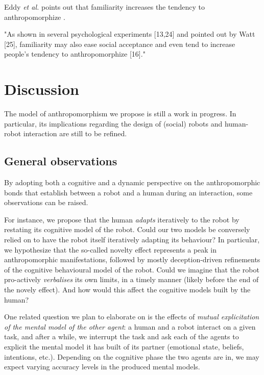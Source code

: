 \documentclass{frontiersSCNS} %
\begin{document}
Eddy \textit{et al.} points out that familiarity increases the tendency to
anthropomorphize \cite{eddy_attribution_1993}.

"As shown in several psychological experiments [13,24] and pointed out by Watt
[25], familiarity may also ease social acceptance and even tend to increase
people's tendency to anthropomorphize [16]." \cite{duffy_anthropomorphism_2003}


%
%
%
%
%
%


\section{Discussion}
\label{sec:discussion}

The model of anthropomorphism we propose is still a work in progress. In
particular, its implications regarding the design of (social) robots and
human-robot interaction are still to be refined.

\subsection{General observations}

By adopting both a cognitive and a dynamic perspective on the anthropomorphic
bonds that establish between a robot and a human during an interaction, some
observations can be raised.

For instance, we propose that the human \emph{adapts} iteratively to the robot
by restating its cognitive model of the robot. Could our two models be
conversely relied on to have the robot itself iteratively adapting its
behaviour? In particular, we hypothesize that the so-called novelty effect
represents a peak in anthropomorphic manifestations, followed by mostly
deception-driven refinements of the cognitive behavioural model of the robot.
Could we imagine that the robot pro-actively \emph{verbalises} its own limits,
in a timely manner (likely before the end of the novely effect). And how would
this affect the cognitive models built by the human?

One related question we plan to elaborate on is the effects of \emph{mutual
explicitation of the mental model of the other agent}: a human and a robot
interact on a given task, and after a while, we interrupt the task and ask each
of the agents to explicit the mental model it has built of its partner
(emotional state, beliefs, intentions, etc.). Depending on the cognitive phase
the two agents are in, we may expect varying accuracy levels in the produced
mental models.
\end{document}
